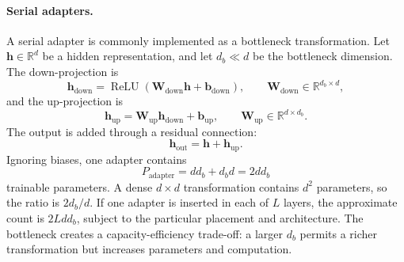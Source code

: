 \paragraph{Serial adapters.}
A serial adapter is commonly implemented as a bottleneck transformation.
Let $\mathbf{h}\in\mathbb{R}^{d}$ be a hidden representation, and let
$d_b\ll d$ be the bottleneck dimension. The down-projection is
\begin{equation}
    \mathbf{h}_{\mathrm{down}}
    =
    \operatorname{ReLU}
    \left(
        \mathbf{W}_{\mathrm{down}}\mathbf{h}
        +\mathbf{b}_{\mathrm{down}}
    \right),
    \qquad
    \mathbf{W}_{\mathrm{down}}\in\mathbb{R}^{d_b\times d},
    \label{eq:peft-adapter-down}
\end{equation}
and the up-projection is
\begin{equation}
    \mathbf{h}_{\mathrm{up}}
    =
    \mathbf{W}_{\mathrm{up}}\mathbf{h}_{\mathrm{down}}
    +\mathbf{b}_{\mathrm{up}},
    \qquad
    \mathbf{W}_{\mathrm{up}}\in\mathbb{R}^{d\times d_b}.
    \label{eq:peft-adapter-up}
\end{equation}
The output is added through a residual connection:
\begin{equation}
    \mathbf{h}_{\mathrm{out}}
    =
    \mathbf{h}+\mathbf{h}_{\mathrm{up}}.
    \label{eq:peft-adapter-residual}
\end{equation}
Ignoring biases, one adapter contains
\begin{equation}
    P_{\mathrm{adapter}}
    =
    dd_b+d_bd
    =
    2dd_b
    \label{eq:peft-adapter-parameters}
\end{equation}
trainable parameters. A dense $d\times d$ transformation contains $d^2$
parameters, so the ratio is $2d_b/d$. If one adapter is inserted in each of
$L$ layers, the approximate count is $2Ldd_b$, subject to the particular
placement and architecture. The bottleneck creates a capacity-efficiency
trade-off: a larger $d_b$ permits a richer transformation but increases
parameters and computation.

